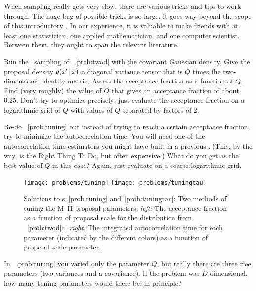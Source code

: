 \documentclass[modern]{aastex61}
\newcommand{\MCMC}{\acronym{MCMC}}
\begin{document}
When sampling really gets very slow,
  there are various tricks and tips to work through.
The huge bag of possible tricks is so large,
  it goes way beyond the scope of this introductory \documentname.
In our experience, it is valuable to make friends with at least one
  statistician, one applied mathematician, and one computer scientist.
Between them, they ought to span the relevant literature.

\begin{problem}\label{prob:tuning}
Run the \MCMC\ sampling of \problemname~\ref{prob:twod} with the
covariant Gaussian density.
Give the proposal density $q(x'\,|\, x)$ a diagonal variance
tensor that is $Q$ times the two-dimensional identity matrix.
Assess the acceptance fraction as a function of $Q$.
Find (very roughly) the value of $Q$ that gives an acceptance
fraction of about 0.25.
Don't try to optimize precisely; just evaluate the acceptance fraction
on a logarithmic grid of $Q$ with values of $Q$ separated by factors
of 2.
\end{problem}

\begin{problem}\label{prob:tuningtau}
Re-do \problemname~\ref{prob:tuning} but instead of trying to reach a
certain acceptance fraction, try to minimize the autocorrelation time.
You will need one of the autocorrelation-time estimators you might have
built in a previous \problemname.
(This, by the way, is the Right Thing To Do, but often expensive.)
What do you get as the best value of $Q$ in this case?
Again, just evaluate on a coarse logarithmic grid.
\end{problem}

\begin{figure}[!htbp]
\begin{center}
\texttt{[image: problems/tuning]}
\texttt{[image: problems/tuningtau]}
\end{center}
\caption{Solutions to \problemname s~\ref{prob:tuning} and~\ref{prob:tuningtau}:
Two methods of tuning the M--H proposal parameters.
\emph{left:} The acceptance fraction as a function of proposal scale for the
distribution from \problemname~\ref{prob:twod}a.
\emph{right:} The integrated autocorrelation time for each parameter
(indicated by the different colors) as a function of proposal scale parameter.}
\label{fig:tuning}
\end{figure}

\begin{problem}
In \problemname~\ref{prob:tuning} you varied only the parameter $Q$, but
really there are three free parameters (two variances and a covariance).
If the problem was $D$-dimensional, how many tuning parameters would there
be, in principle?
\end{problem}
\end{document}
